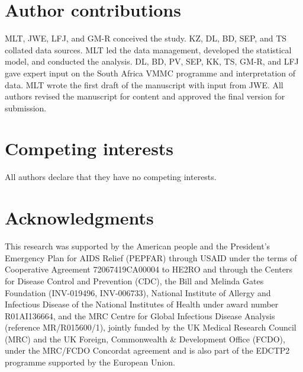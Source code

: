\documentclass{article}
\begin{document}
\section*{Author contributions}


MLT, JWE, LFJ, and GM-R conceived the study. KZ, DL, BD, SEP, and TS collated data sources. MLT led the data management, developed the statistical model, and conducted the analysis. DL, BD, PV, SEP, KK, TS, GM-R, and LFJ gave expert input on the South Africa VMMC programme and interpretation of data. MLT wrote the first draft of the manuscript with input from JWE. All authors revised the manuscript for content and approved the final version for submission.


\section*{Competing interests}


All authors declare that they have no competing interests. 


\section*{Acknowledgments}


This research was supported by the American people and the President's Emergency Plan for AIDS Relief (PEPFAR) through USAID under the terms of Cooperative Agreement 72067419CA00004 to HE2RO and through the Centers for Disease Control and Prevention (CDC), the Bill and Melinda Gates Foundation (INV-019496, INV-006733), National Institute of Allergy and Infectious Disease of the National Institutes of Health under award number R01AI136664, and the MRC Centre for Global Infectious Disease Analysis (reference MR/R015600/1), jointly funded by the UK Medical Research Council (MRC) and the UK Foreign, Commonwealth \& Development Office (FCDO), under the MRC/FCDO Concordat agreement and is also part of the EDCTP2 programme supported by the European Union.
\end{document}
